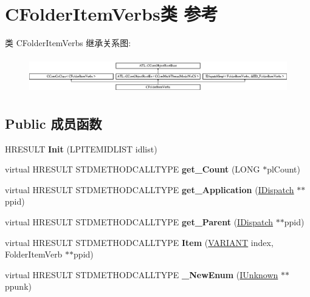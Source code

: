 \hypertarget{class_c_folder_item_verbs}{}\section{C\+Folder\+Item\+Verbs类 参考}
\label{class_c_folder_item_verbs}
类 C\+Folder\+Item\+Verbs 继承关系图\+:\begin{figure}[H]
\begin{center}
\leavevmode
\includegraphics[height=1.590909cm]{class_c_folder_item_verbs}
\end{center}
\end{figure}
\subsection*{Public 成员函数}
\begin{DoxyCompactItemize}
\item 
\mbox{\label{class_c_folder_item_verbs_a0b3fb286536a9164857d01c9c322cacd}} 
H\+R\+E\+S\+U\+LT {\bfseries Init} (L\+P\+I\+T\+E\+M\+I\+D\+L\+I\+ST idlist)
\item 
\mbox{\label{class_c_folder_item_verbs_a6eeac70f73d82d7f48b9e4fdf92d260c}} 
virtual H\+R\+E\+S\+U\+LT S\+T\+D\+M\+E\+T\+H\+O\+D\+C\+A\+L\+L\+T\+Y\+PE {\bfseries get\+\_\+\+Count} (L\+O\+NG $\ast$pl\+Count)
\item 
\mbox{\label{class_c_folder_item_verbs_ae8604f2729d2cc798816bbb229082a31}} 
virtual H\+R\+E\+S\+U\+LT S\+T\+D\+M\+E\+T\+H\+O\+D\+C\+A\+L\+L\+T\+Y\+PE {\bfseries get\+\_\+\+Application} (\hyperlink{interface_i_dispatch}{I\+Dispatch} $\ast$$\ast$ppid)
\item 
\mbox{\label{class_c_folder_item_verbs_a38e9d130e20bf65c0b6cf75629141bb4}} 
virtual H\+R\+E\+S\+U\+LT S\+T\+D\+M\+E\+T\+H\+O\+D\+C\+A\+L\+L\+T\+Y\+PE {\bfseries get\+\_\+\+Parent} (\hyperlink{interface_i_dispatch}{I\+Dispatch} $\ast$$\ast$ppid)
\item 
\mbox{\label{class_c_folder_item_verbs_a28682143409a66c31452982d684f5093}} 
virtual H\+R\+E\+S\+U\+LT S\+T\+D\+M\+E\+T\+H\+O\+D\+C\+A\+L\+L\+T\+Y\+PE {\bfseries Item} (\hyperlink{structtag_v_a_r_i_a_n_t}{V\+A\+R\+I\+A\+NT} index, Folder\+Item\+Verb $\ast$$\ast$ppid)
\item 
\mbox{\label{class_c_folder_item_verbs_a23f170dd4c3e63e4c765a875726639bd}} 
virtual H\+R\+E\+S\+U\+LT S\+T\+D\+M\+E\+T\+H\+O\+D\+C\+A\+L\+L\+T\+Y\+PE {\bfseries \+\_\+\+New\+Enum} (\hyperlink{interface_i_unknown}{I\+Unknown} $\ast$$\ast$ppunk)
\end{DoxyCompactItemize}

